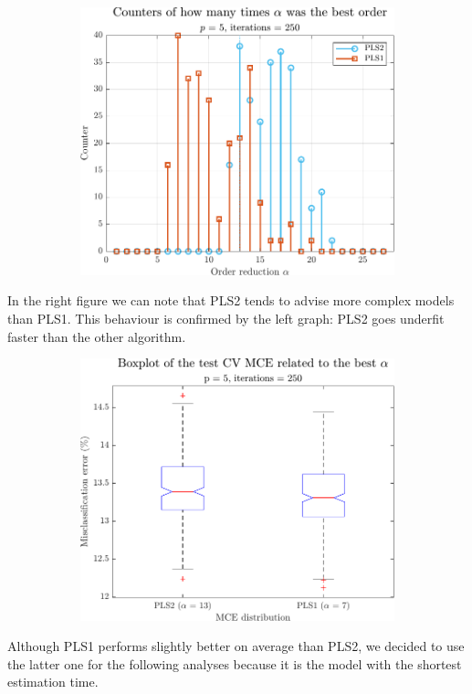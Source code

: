 \begin{frame}
\begin{figure}
\begin{subfigure}[b]{0.49\textwidth}
			\includegraphics[width=\textwidth]{Images/counters_alpha_5.pdf}
		\end{subfigure}
	\end{figure}
	In the right figure we can note that PLS2 tends to advise more complex models than PLS1. This behaviour is confirmed by the left graph: PLS2 goes underfit faster than the other algorithm.
\end{frame}

\begin{frame}
	\begin{figure}
		\centering
		\begin{subfigure}[b]{0.60\textwidth}
			\includegraphics[width=\textwidth]{Images/box_alpha_5.pdf}
		\end{subfigure}
	\end{figure}
	Although PLS1 performs slightly better on average than PLS2, we decided to use the latter one for the following analyses because it is the model with the shortest estimation time.
\end{frame}

